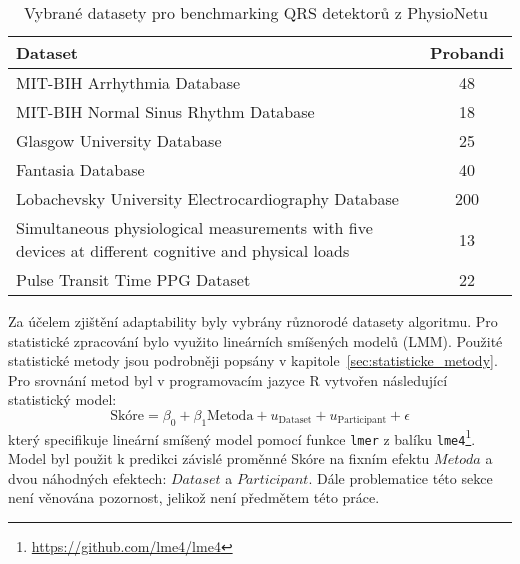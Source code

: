 \begin{table}[h]
    \begin{center}
        \caption{\label{tab:bench_datasets} Vybrané datasety pro benchmarking
            QRS detektorů z PhysioNetu~\cite{PhysioNet}}
        \renewcommand{\arraystretch}{1.3}
        \begin{tabular}{p{12cm}c}
            \toprule
            \textbf{Dataset}                                                                                                 & \textbf{Probandi} \\ \midrule
            MIT-BIH Arrhythmia Database~\cite{MITBIHArrhythmia}                                                              & 48                \\
            MIT-BIH Normal Sinus Rhythm Database~\cite{Beth1990}                                                             & 18                \\
            Glasgow University Database~\cite{GUDB}                                                                          & 25                \\
            Fantasia Database~\cite{FANTASIA}                                                                                & 40                \\
            Lobachevsky University Electrocardiography Database~\cite{LUDB}                                                  & 200               \\
            Simultaneous physiological measurements with five devices at different cognitive and physical loads~\cite{IFADO} & 13                \\
            Pulse Transit Time PPG Dataset~\cite{USYD}                                                                       & 22                \\
            \bottomrule
        \end{tabular}
    \end{center}
\end{table}

Za účelem zjištění adaptability byly vybrány různorodé datasety algoritmu. Pro
statistické zpracování bylo využito lineárních smíšených modelů (\gls{LMM}).
Použité statistické metody jsou podrobněji popsány v
kapitole~\ref{sec:statisticke_metody}. Pro srovnání metod byl v programovacím
jazyce R vytvořen následující statistický model:
\begin{equation}
    \text{Skóre} = \beta_0 + \beta_1\text{Metoda} + u_{\text{Dataset}} + u_{\text{Participant}} + \epsilon
\end{equation}
který specifikuje lineární smíšený model pomocí funkce \texttt{lmer} z balíku
\texttt{lme4}\footnote{\url{https://github.com/lme4/lme4}}. Model byl použit k
predikci závislé proměnné Skóre na fixním efektu $Metoda$ a dvou náhodných
efektech: $Dataset$ a $Participant$. Dále problematice této sekce není věnována
pozornost, jelikož není předmětem této práce. 

